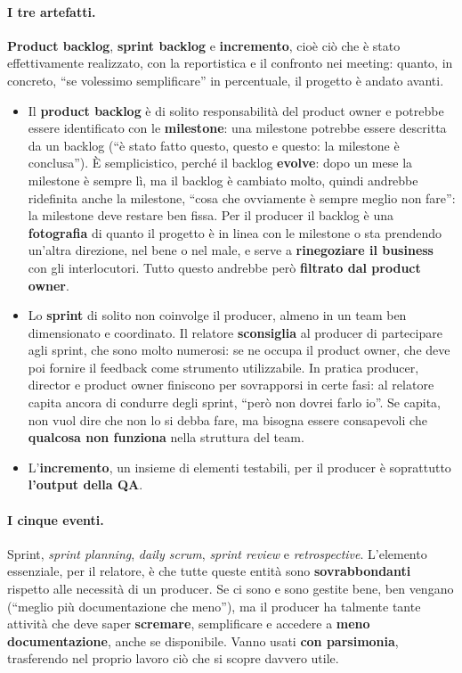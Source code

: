 \paragraph{I tre artefatti.} \textbf{Product backlog}, \textbf{sprint backlog} e
\textbf{incremento}, cioè ciò che è stato effettivamente realizzato, con la
reportistica e il confronto nei meeting: quanto, in concreto, ``se volessimo
semplificare'' in percentuale, il progetto è andato avanti.
\begin{itemize}
  \item Il \textbf{product backlog} è di solito responsabilità del product owner
        e potrebbe essere identificato con le \textbf{milestone}: una milestone
        potrebbe essere descritta da un backlog (``è stato fatto questo, questo e
        questo: la milestone è conclusa''). È semplicistico, perché il backlog
        \textbf{evolve}: dopo un mese la milestone è sempre lì, ma il backlog è
        cambiato molto, quindi andrebbe ridefinita anche la milestone, ``cosa che
        ovviamente è sempre meglio non fare'': la milestone deve restare ben
        fissa. Per il producer il backlog è una \textbf{fotografia} di quanto il
        progetto è in linea con le milestone o sta prendendo un'altra direzione,
        nel bene o nel male, e serve a \textbf{rinegoziare il business} con gli
        interlocutori. Tutto questo andrebbe però \textbf{filtrato dal product
        owner}.
  \item Lo \textbf{sprint} di solito non coinvolge il producer, almeno in un team
        ben dimensionato e coordinato. Il relatore \textbf{sconsiglia} al producer
        di partecipare agli sprint, che sono molto numerosi: se ne occupa il
        product owner, che deve poi fornire il feedback come strumento
        utilizzabile. In pratica producer, director e product owner finiscono per
        sovrapporsi in certe fasi: al relatore capita ancora di condurre degli
        sprint, ``però non dovrei farlo io''. Se capita, non vuol dire che non lo
        si debba fare, ma bisogna essere consapevoli che \textbf{qualcosa non
        funziona} nella struttura del team.
  \item L'\textbf{incremento}, un insieme di elementi testabili, per il producer
        è soprattutto \textbf{l'output della QA}.
\end{itemize}

\paragraph{I cinque eventi.} Sprint, \emph{sprint planning}, \emph{daily
scrum}, \emph{sprint review} e \emph{retrospective}. L'elemento essenziale, per il
relatore, è che tutte queste entità sono \textbf{sovrabbondanti} rispetto alle
necessità di un producer. Se ci sono e sono gestite bene, ben vengano (``meglio
più documentazione che meno''), ma il producer ha talmente tante attività che
deve saper \textbf{scremare}, semplificare e accedere a \textbf{meno
documentazione}, anche se disponibile. Vanno usati \textbf{con parsimonia},
trasferendo nel proprio lavoro ciò che si scopre davvero utile.

